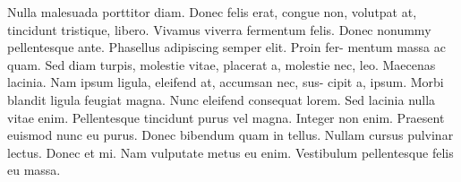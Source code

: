 Nulla malesuada porttitor diam. Donec felis erat, congue
non, volutpat at, tincidunt tristique, libero. Vivamus viverra fermentum felis.
Donec nonummy pellentesque ante. Phasellus adipiscing semper elit. Proin fer-
mentum massa ac quam. Sed diam turpis, molestie vitae, placerat a, molestie
nec, leo. Maecenas lacinia. Nam ipsum ligula, eleifend at, accumsan nec, sus-
cipit a, ipsum. Morbi blandit ligula feugiat magna. Nunc eleifend consequat
lorem. Sed lacinia nulla vitae enim. Pellentesque tincidunt purus vel magna.
Integer non enim. Praesent euismod nunc eu purus. Donec bibendum quam in
tellus. Nullam cursus pulvinar lectus. Donec et mi. Nam vulputate metus eu
enim. Vestibulum pellentesque felis eu massa.
